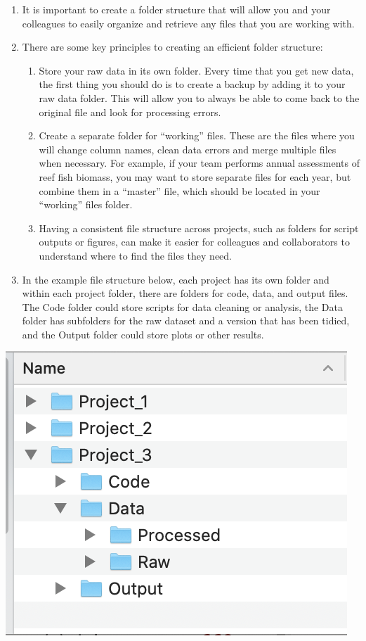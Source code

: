 \documentclass[
]{book}
\providecommand{\tightlist}{%
  \setlength{\itemsep}{0pt}\setlength{\parskip}{0pt}}
\begin{document}
\begin{enumerate}
\def\labelenumi{\arabic{enumi}.}
\item
  It is important to create a folder structure that will allow you and your colleagues to easily organize and retrieve any files that you are working with.
\item
  There are some key principles to creating an efficient folder structure:

  \begin{enumerate}
  \def\labelenumii{\arabic{enumii}.}
  \tightlist
  \item
    Store your raw data in its own folder. Every time that you get new data, the first thing you should do is to create a backup by adding it to your raw data folder. This will allow you to always be able to come back to the original file and look for processing errors.
  \item
    Create a separate folder for ``working'' files. These are the files where you will change column names, clean data errors and merge multiple files when necessary. For example, if your team performs annual assessments of reef fish biomass, you may want to store separate files for each year, but combine them in a ``master'' file, which should be located in your ``working'' files folder.
  \item
    Having a consistent file structure across projects, such as folders for script outputs or figures, can make it easier for colleagues and collaborators to understand where to find the files they need.
  \end{enumerate}
\item
  In the example file structure below, each project has its own folder and within each project folder, there are folders for code, data, and output files. The Code folder could store scripts for data cleaning or analysis, the Data folder has subfolders for the raw dataset and a version that has been tidied, and the Output folder could store plots or other results.
\end{enumerate}

\includegraphics{images/M2S1_example_file_structure.png}
\end{document}
